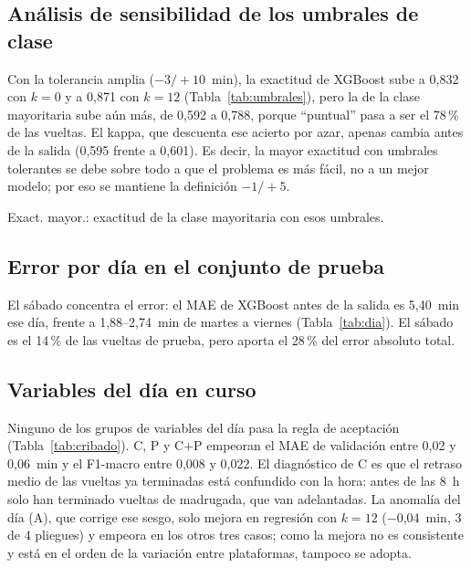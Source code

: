 \documentclass[conference]{IEEEtran}
\newcommand{\tablesize}{\fontsize{7}{8.4}\selectfont}
\newcommand{\ajustar}[1]{%
  \sbox{\tabbox}{#1}%
  \ifdim\wd\tabbox>\columnwidth
    \typeout{AVISO-TABLA: tabla mas ancha que la columna (\the\wd\tabbox\space > \the\columnwidth); se reduce}%
    \resizebox{\columnwidth}{!}{\usebox{\tabbox}}%
  \else
    \usebox{\tabbox}%
  \fi}
\newcommand{\tabla}[1]{\tablesize\setlength{\tabcolsep}{2pt}\ajustar{}}
\begin{document}
\subsection{Análisis de sensibilidad de los umbrales de clase}\label{sec:res-umbrales}
Con la tolerancia amplia ($-3/+10$~min), la exactitud de XGBoost sube a 0,832 con $k = 0$ y a 0,871 con $k = 12$ (Tabla~\ref{tab:umbrales}), pero la de la clase mayoritaria sube aún más, de 0,592 a 0,788, porque ``puntual'' pasa a ser el 78\,\% de las vueltas. El kappa, que descuenta ese acierto por azar, apenas cambia antes de la salida (0,595 frente a 0,601). Es decir, la mayor exactitud con umbrales tolerantes se debe sobre todo a que el problema es más fácil, no a un mejor modelo; por eso se mantiene la definición $-1/+5$.

\begin{table}[!t]
\centering
\caption{Clasificación con umbrales principales y con tolerancia amplia (XGBoost, prueba)}\label{tab:umbrales}
\tabla{t_umbrales}

\vspace{2pt}\raggedright\scriptsize Exact. mayor.: exactitud de la clase mayoritaria con esos umbrales.
\end{table}

\subsection{Error por día en el conjunto de prueba}
El sábado concentra el error: el MAE de XGBoost antes de la salida es 5,40~min ese día, frente a 1,88--2,74~min de martes a viernes (Tabla~\ref{tab:dia}). El sábado es el 14\,\% de las vueltas de prueba, pero aporta el 28\,\% del error absoluto total.

\begin{table}[!t]
\centering
\caption{Error de XGBoost ($k = 0$) por día de prueba}\label{tab:dia}
\tabla{t_dia}
\end{table}

\subsection{Variables del día en curso}
Ninguno de los grupos de variables del día pasa la regla de aceptación (Tabla~\ref{tab:cribado}). C, P y C+P empeoran el MAE de validación entre 0,02 y 0,06~min y el F1-macro entre 0,008 y 0,022. El diagnóstico de C es que el retraso medio de las vueltas ya terminadas está confundido con la hora: antes de las 8~h solo han terminado vueltas de madrugada, que van adelantadas. La anomalía del día (A), que corrige ese sesgo, solo mejora en regresión con $k = 12$ ($-$0,04~min, 3 de 4 pliegues) y empeora en los otros tres casos; como la mejora no es consistente y está en el orden de la variación entre plataformas, tampoco se adopta.
\end{document}
